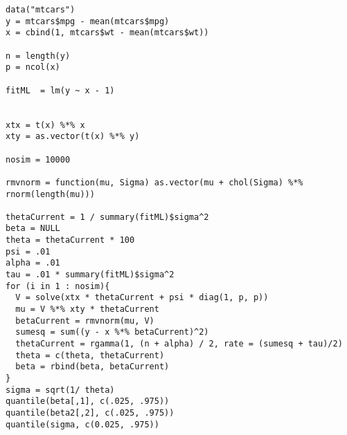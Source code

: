 \begin{verbatim}
data("mtcars")
y = mtcars$mpg - mean(mtcars$mpg)
x = cbind(1, mtcars$wt - mean(mtcars$wt))

n = length(y)
p = ncol(x)

fitML  = lm(y ~ x - 1)


xtx = t(x) %*% x
xty = as.vector(t(x) %*% y)

nosim = 10000

rmvnorm = function(mu, Sigma) as.vector(mu + chol(Sigma) %*% rnorm(length(mu)))

thetaCurrent = 1 / summary(fitML)$sigma^2
beta = NULL
theta = thetaCurrent * 100
psi = .01
alpha = .01
tau = .01 * summary(fitML)$sigma^2
for (i in 1 : nosim){
  V = solve(xtx * thetaCurrent + psi * diag(1, p, p))  
  mu = V %*% xty * thetaCurrent
  betaCurrent = rmvnorm(mu, V)
  sumesq = sum((y - x %*% betaCurrent)^2)
  thetaCurrent = rgamma(1, (n + alpha) / 2, rate = (sumesq + tau)/2)
  theta = c(theta, thetaCurrent)
  beta = rbind(beta, betaCurrent)
}
sigma = sqrt(1/ theta)
quantile(beta[,1], c(.025, .975))
quantile(beta2[,2], c(.025, .975))
quantile(sigma, c(0.025, .975))
\end{verbatim}


